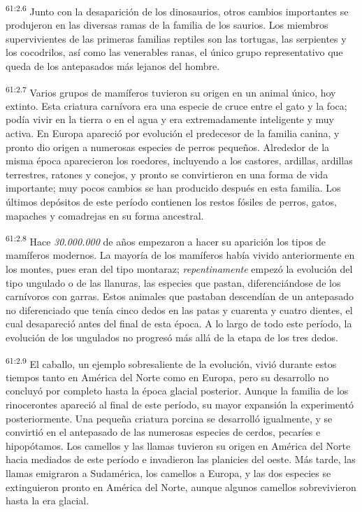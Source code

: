 \par
\textsuperscript{61:2.6} Junto con la desaparición de los dinosaurios, otros cambios importantes se produjeron en las diversas ramas de la familia de los saurios. Los miembros supervivientes de las primeras familias reptiles son las tortugas, las serpientes y los cocodrilos, así como las venerables ranas, el único grupo representativo que queda de los antepasados más lejanos del hombre.

\par
\textsuperscript{61:2.7} Varios grupos de mamíferos tuvieron su origen en un animal único, hoy extinto. Esta criatura carnívora era una especie de cruce entre el gato y la foca; podía vivir en la tierra o en el agua y era extremadamente inteligente y muy activa. En Europa apareció por evolución el predecesor de la familia canina, y pronto dio origen a numerosas especies de perros pequeños. Alrededor de la misma época aparecieron los roedores, incluyendo a los castores, ardillas, ardillas terrestres, ratones y conejos, y pronto se convirtieron en una forma de vida importante; muy pocos cambios se han producido después en esta familia. Los últimos depósitos de este período contienen los restos fósiles de perros, gatos, mapaches y comadrejas en su forma ancestral.

\par
\textsuperscript{61:2.8} Hace \textit{30.000.000} de años empezaron a hacer su aparición los tipos de mamíferos modernos. La mayoría de los mamíferos había vivido anteriormente en los montes, pues eran del tipo montaraz; \textit{repentinamente} empezó la evolución del tipo ungulado o de las llanuras, las especies que pastan, diferenciándose de los carnívoros con garras. Estos animales que pastaban descendían de un antepasado no diferenciado que tenía cinco dedos en las patas y cuarenta y cuatro dientes, el cual desapareció antes del final de esta época. A lo largo de todo este período, la evolución de los ungulados no progresó más allá de la etapa de los tres dedos.

\par
\textsuperscript{61:2.9} El caballo, un ejemplo sobresaliente de la evolución, vivió durante estos tiempos tanto en América del Norte como en Europa, pero su desarrollo no concluyó por completo hasta la época glacial posterior. Aunque la familia de los rinocerontes apareció al final de este período, su mayor expansión la experimentó posteriormente. Una pequeña criatura porcina se desarrolló igualmente, y se convirtió en el antepasado de las numerosas especies de cerdos, pecaríes e hipopótamos. Los camellos y las llamas tuvieron su origen en América del Norte hacia mediados de este período e invadieron las planicies del oeste. Más tarde, las llamas emigraron a Sudamérica, los camellos a Europa, y las dos especies se extinguieron pronto en América del Norte, aunque algunos camellos sobrevivieron hasta la era glacial.

